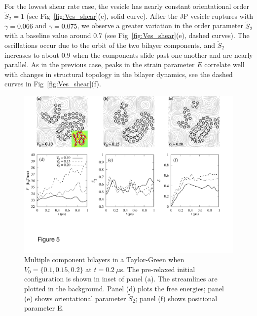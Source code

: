 \documentclass[prb,preprint,showpacs,preprintnumbers,amsmath,amssymb,longbibliography]{revtex4-1}
\begin{document}
For the lowest shear rate case, the vesicle has nearly constant orientational order $\tilde S_2 = 1$
(see Fig~\ref{fig:Ves_shear}(e), solid curve).
After the JP vesicle
ruptures with $\dot\gamma= 0.066$ and $\dot \gamma= 0.075$,
we observe a greater variation in the order parameter $\tilde{S}_2$
with a baseline value around $0.7$
(see Fig~\ref{fig:Ves_shear}(e), dashed curves).
The oscillations occur due to the orbit of the two bilayer components,
and $\tilde{S}_2$ increases to about $0.9$ when the components slide past one another and are nearly parallel.
%
As in the previous case, peaks in the strain parameter $E$
correlate well with changes in structural topology in the bilayer dynamics, see
the dashed curves in Fig~\ref{fig:Ves_shear}(f).


%
\begin{figure}
  \begin{center}
    \includegraphics[width=1.0\textwidth]{Figures/Figure5.pdf}    
  \end{center}
  \vspace{-20pt}  
  \caption{\label{fig:BC1_TG} Multiple component bilayers in a Taylor-Green when $V_0 = \{0.1, 0.15, 0.2\}$ at $t=0.2\ \mu$s. The pre-relaxed initial configuration is shown in inset of panel (a). 
 The streamlines are plotted in the background. 
Panel (d) plots the free energies; panel (e) shows orientational parameter $\tilde{S}_2$; panel (f) shows positional parameter E.
  }
\end{figure}
%
\end{document}
